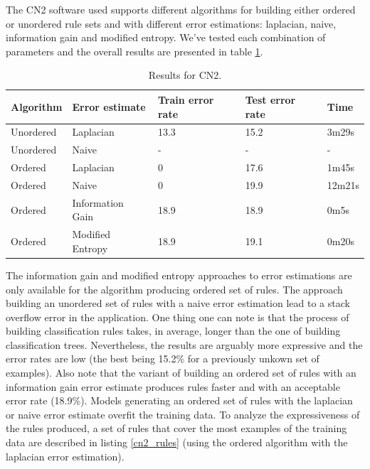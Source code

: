 \documentclass[a4paper]{llncs}
\begin{document}
The CN2 software used supports different algorithms for building either ordered
or unordered rule sets and with different error estimations: laplacian, naive,
information gain and modified entropy. We've tested each combination of
parameters and the overall results are presented in table \ref{tbl:results_cn2}.

\begin{table}
\begin{center}
\begin{tabular}{ | l | l | l | l | l |}
    \hline
    \textbf{Algorithm} & \textbf{Error estimate} & \textbf{Train error rate} & \textbf{Test error rate} & \textbf{Time} \\ \hline
    Unordered & Laplacian & 13.3 & 15.2 & 3m29s \\ \hline
    Unordered & Naive & - & - & - \\ \hline
    Ordered & Laplacian & 0 & 17.6 & 1m45s \\ \hline
    Ordered & Naive & 0 & 19.9 & 12m21s \\ \hline
    Ordered & Information Gain & 18.9 & 18.9 & 0m5s \\ \hline
    Ordered & Modified Entropy & 18.9 & 19.1 & 0m20s \\ \hline
\end{tabular}
\caption{Results for CN2.}
\label{tbl:results_cn2}
\end{center}
\end{table}

The information gain and modified entropy approaches to error estimations are
only available for the algorithm producing ordered set of rules. The approach
building an unordered set of rules with a naive error estimation lead to a stack
overflow error in the application. One thing one can note is that the process of
building classification rules takes, in average, longer than the one of building
classification trees. Nevertheless, the results are arguably more expressive and
the error rates are low (the best being 15.2\% for a previously unkown set of 
examples). Also note that the variant of building an ordered set of rules with
an information gain error estimate produces rules faster and with an acceptable
error rate (18.9\%). Models generating an ordered set of rules with the 
laplacian or naive error estimate overfit the training data. To analyze the 
expressiveness of the rules produced, a set of rules that cover the most 
examples of the training data are described in listing \ref{cn2_rules} (using 
the ordered algorithm with the laplacian error estimation).
\end{document}
